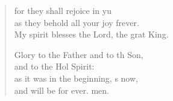 \begin{verse}
\begin{patverse}
for they shall rejoice in yu\Flex\\
as they behold all your joy frever.\Med\\
My spirit blesses the Lord, the grat King.

Glory to the Father and to th Son,\Med\\
and to the Hol Spirit:\\
as it was in the beginning, \pointup{\i}s now,\Med\\
and will be for ever. men.

  \end{patverse}
\end{verse}
